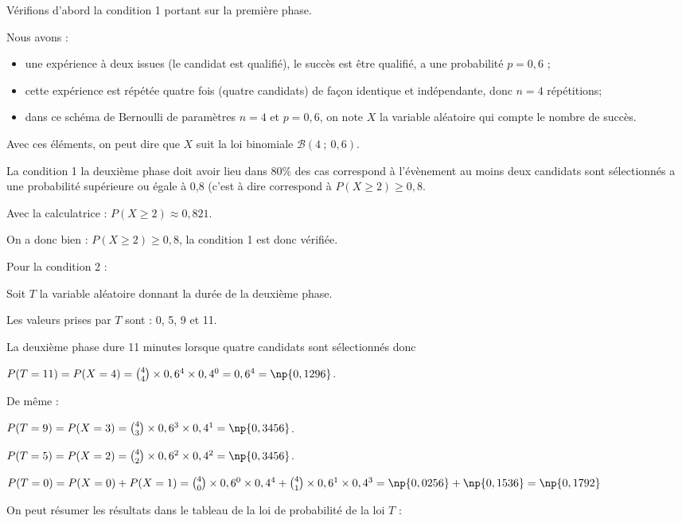 \bigskip

Vérifions d'abord la condition 1 portant sur la première phase.

Nous avons :
\begin{itemize}
\item une expérience à deux issues (le candidat est qualifié), le succès est \og être qualifié\fg{}, a une probabilité $p = 0,6$ ;
\item cette expérience est répétée quatre fois (quatre candidats) de façon identique et indépendante, donc $n=4$ répétitions;
\item dans ce schéma de Bernoulli de paramètres $n=4$ et $p=0,6$, on note $X$ la variable aléatoire qui compte le nombre de succès.
\end{itemize}

Avec ces éléments, on peut dire que $X$ suit la loi binomiale $ \mathcal{B}\left(4 ~;~ 0,6\right)$.

La condition 1 \og la deuxième phase doit avoir lieu dans 80\% des cas \fg{} correspond à l'évènement \og au moins deux candidats sont sélectionnés \fg{} a une probabilité supérieure ou égale à 0,8 (c'est à dire correspond à $P(X \geqslant 2)\geqslant 0,8$.

Avec la calculatrice : $\displaystyle P(X \geqslant  2)  \approx 0,821$.

On a donc bien : $P(X \geqslant 2)\geqslant 0,8$, la condition 1 est donc vérifiée.

\bigskip 

Pour la condition 2 :

Soit $T$ la variable aléatoire donnant la durée de la deuxième phase.

Les valeurs prises par $T$ sont : 0, 5, 9 et 11.

La deuxième phase dure 11 minutes lorsque quatre candidats sont sélectionnés donc

 $P(T=11)=P(X=4)= \binom{4}{4}\times 0,6^4\times 0,4^{0}=0,6^4= \np{0,1296}$.

De même :

$P(T=9)=P(X=3)= \binom{4}{3}\times 0,6^3\times 0,4^1= \np{0,3456}$.

$P(T=5)=P(X=2)= \binom{4}{2}\times 0,6^2\times 0,4^2= \np{0,3456}$.

$P(T=0)=P(X=0)+P(X=1)= \binom{4}{0}\times 0,6^0\times 0,4^4+ \binom{4}{1}\times 0,6^1\times 0,4^3= \np{0,0256} + \np{0,1536} = \np{0,1792}$


On peut résumer les résultats dans le tableau de la loi de probabilité de la loi $T$ : 

